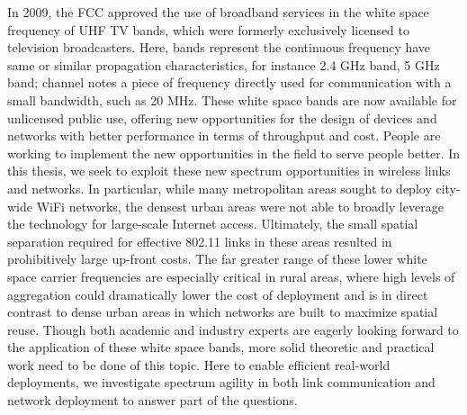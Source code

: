 In 2009, the FCC approved the use of broadband services in the white space 
frequency of UHF TV bands, which were formerly exclusively 
licensed to television broadcasters. Here, bands represent the continuous
frequency have same or similar propagation characteristics, for instance 2.4 GHz
band, 5 GHz band; channel notes
a piece of frequency directly used for communication with a small bandwidth, such
as 20 MHz.
These white space bands are now available 
for unlicensed public use, offering new opportunities for the design of devices 
and networks with better performance in terms of throughput and cost. 
People are working to implement the new opportunities in the field to serve people better. 
In this thesis, we seek to exploit these new spectrum opportunities in wireless links
and networks. In particular, while many 
metropolitan areas sought to deploy city-wide WiFi networks, the densest urban 
areas were not able to broadly leverage the technology for large-scale Internet 
access.  Ultimately, the small spatial separation required for effective 802.11 
links in these areas resulted in prohibitively large up-front costs. The far 
greater range of these lower white space carrier frequencies are especially 
critical in rural areas, where high levels of aggregation could dramatically 
lower the cost of deployment and is in direct contrast to dense urban areas in 
which networks are built to maximize spatial reuse. Though both academic and 
industry experts are eagerly looking forward to the application of these white space 
bands, more solid theoretic and practical work need to be done of this topic. 
Here to enable efficient real-world deployments, we investigate spectrum agility in both link communication 
and network deployment to answer part of the questions. 

